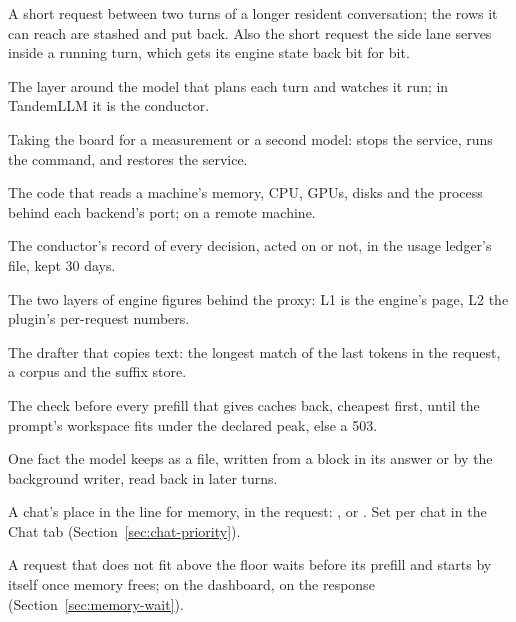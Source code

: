 \begin{description}[style=unboxed, leftmargin=0pt, itemsep=.5ex, font=\normalfont\bfseries]
\item[guest] A short request between two turns of a longer resident conversation; the rows it can reach are stashed and put back. Also the short request the side lane serves inside a running turn, which gets its engine state back bit for bit.

\item[harness] The layer around the model that plans each turn and watches it run; in TandemLLM it is the conductor.

\item[hold] Taking the board for a measurement or a second model:  stops the service, runs the command, and restores the service.

\item[host collector] The code that reads a machine's memory, CPU, GPUs, disks and the process behind each backend's port;  on a remote machine.

\item[journal] The conductor's record of every decision, acted on or not, in the usage ledger's file, kept 30 days.

\item[L1, L2] The two layers of engine figures behind the proxy: L1 is the engine's  page, L2 the plugin's per-request numbers.

\item[lookup drafter] The drafter that copies text: the longest match of the last tokens in the request, a corpus and the suffix store.

\item[memory gate] The check before every prefill that gives caches back, cheapest first, until the prompt's workspace fits under the declared peak, else a 503.

\item[memory note] One fact the model keeps as a file, written from a block in its answer or by the background writer, read back in later turns.

\item[memory priority] A chat's place in the line for memory,  in the request: ,  or . Set per chat in the Chat tab (Section~\ref{sec:chat-priority}).

\item[memory wait] A request that does not fit above the floor waits before its prefill and starts by itself once memory frees;  on the dashboard,  on the response (Section~\ref{sec:memory-wait}).


\end{description}
